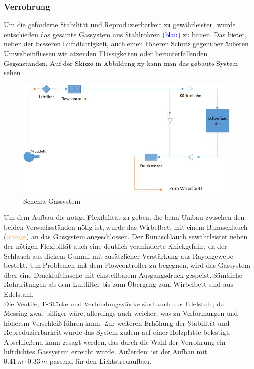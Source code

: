 \subsubsection{Verrohrung}

Um die geforderte Stabilität und Reproduzierbarkeit zu gewährleisten, wurde entschieden das gesamte Gassystem aus Stahlrohren (\textcolor{blue}{blau}) zu bauen. Das bietet, neben der besseren Luftdichtigkeit, auch einen höheren Schutz gegenüber äußeren Umwelteinflüssen wie ätzenden Flüssigkeiten oder herunterfallenden Gegenständen.
Auf der Skizze in Abbildung xy kann man das gebaute System sehen:
\hfill \\

\begin{figure}[h]
	\begin{center}
		\includegraphics[scale=0.6]{Aufbau_Gassystem.jpg}
		\caption[Schema Gassystem]{Schema Gassystem}
	\end{center}
\end{figure}


Um dem Aufbau die nötige Flexibilität zu geben, die beim Umbau zwischen den beiden Versuchsständen nötig ist, wurde das Wirbelbett mit einem Bunaschlauch (\textcolor{orange}{orange}) an das Gassystem angeschlossen. Der Bunaschlauch gewährleistet neben der nötigen Flexibiltät auch eine deutlich verminderte Knickgefahr, da der Schlauch aus dickem Gummi mit zusätzlicher Verstärkung aus Rayongewebe besteht.
Um Problemen mit dem Flowcontroller zu begegnen, wird das Gassystem über eine Druckluftflasche mit einstellbarem Ausgangsdruck gespeist. Sämtliche Rohrleitungen ab dem Luftfilter bis zum Übergang zum Wirbelbett sind aus Edelstahl. \\
Die Ventile, T-Stücke und Verbindungsstücke sind auch aus Edelstahl, da Messing zwar billiger wäre, allerdings auch weicher, was zu Verformungen und höherem Verschleiß führen kann. Zur weiteren Erhöhung der Stabilität und Reproduzierbarkeit wurde das System zudem auf einer Holzplatte befestigt. \\
Abschließend kann gesagt werden, das durch die Wahl der Verrohrung ein luftdichtes Gassystem erreicht wurde. Außerdem ist der Aufbau mit $\SI{0,41}{m} \cdot \SI{0,33}{m}$ passend für den Lichtstreuaufbau.


